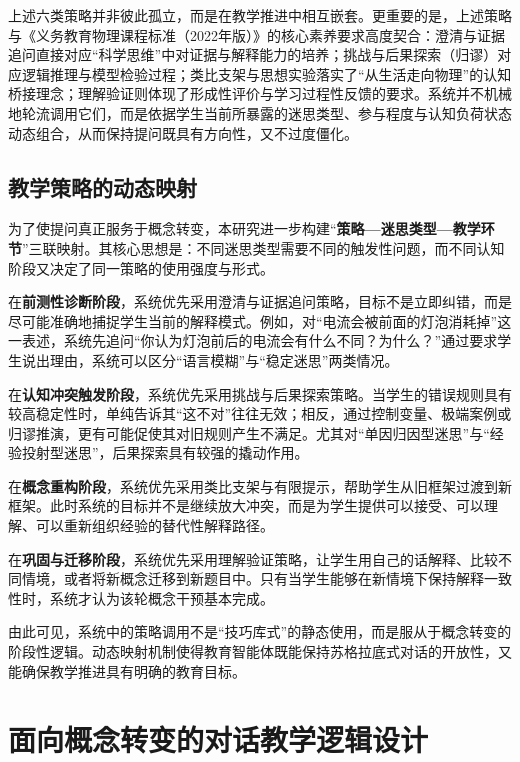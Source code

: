 上述六类策略并非彼此孤立，而是在教学推进中相互嵌套。更重要的是，上述策略与《义务教育物理课程标准（2022年版）》的核心素养要求高度契合\cite{moe2022physicsstandard}：澄清与证据追问直接对应“科学思维”中对证据与解释能力的培养；挑战与后果探索（归谬）对应逻辑推理与模型检验过程；类比支架与思想实验落实了“从生活走向物理”的认知桥接理念；理解验证则体现了形成性评价与学习过程性反馈的要求。系统并不机械地轮流调用它们，而是依据学生当前所暴露的迷思类型、参与程度与认知负荷状态动态组合，从而保持提问既具有方向性，又不过度僵化。

\subsection{教学策略的动态映射}
\label{sec:4.2.3}

为了使提问真正服务于概念转变，本研究进一步构建“\textbf{策略—迷思类型—教学环节}”三联映射。其核心思想是：不同迷思类型需要不同的触发性问题，而不同认知阶段又决定了同一策略的使用强度与形式。

在\textbf{前测性诊断阶段}，系统优先采用澄清与证据追问策略，目标不是立即纠错，而是尽可能准确地捕捉学生当前的解释模式。例如，对“电流会被前面的灯泡消耗掉”这一表述，系统先追问“你认为灯泡前后的电流会有什么不同？为什么？”通过要求学生说出理由，系统可以区分“语言模糊”与“稳定迷思”两类情况。

在\textbf{认知冲突触发阶段}，系统优先采用挑战与后果探索策略。当学生的错误规则具有较高稳定性时，单纯告诉其“这不对”往往无效；相反，通过控制变量、极端案例或归谬推演，更有可能促使其对旧规则产生不满足。尤其对“单因归因型迷思”与“经验投射型迷思”，后果探索具有较强的撬动作用。

在\textbf{概念重构阶段}，系统优先采用类比支架与有限提示，帮助学生从旧框架过渡到新框架。此时系统的目标并不是继续放大冲突，而是为学生提供可以接受、可以理解、可以重新组织经验的替代性解释路径。

在\textbf{巩固与迁移阶段}，系统优先采用理解验证策略，让学生用自己的话解释、比较不同情境，或者将新概念迁移到新题目中。只有当学生能够在新情境下保持解释一致性时，系统才认为该轮概念干预基本完成。

由此可见，系统中的策略调用不是“技巧库式”的静态使用，而是服从于概念转变的阶段性逻辑。动态映射机制使得教育智能体既能保持苏格拉底式对话的开放性，又能确保教学推进具有明确的教育目标。

\section{面向概念转变的对话教学逻辑设计}
\label{sec:4.3}


